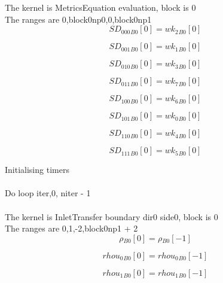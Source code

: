 \documentclass{article}
\begin{document}
\noindent The kernel is MetricsEquation evaluation, block is 0\\\noindent The ranges are 0,block0np0,0,block0np1\\\begin{dmath}{SD_{000}{_{B0}}}[{0}] = {wk_{2}{_{B0}}}[{0}]\end{dmath}

\begin{dmath}{SD_{001}{_{B0}}}[{0}] = {wk_{1}{_{B0}}}[{0}]\end{dmath}

\begin{dmath}{SD_{010}{_{B0}}}[{0}] = {wk_{3}{_{B0}}}[{0}]\end{dmath}

\begin{dmath}{SD_{011}{_{B0}}}[{0}] = {wk_{7}{_{B0}}}[{0}]\end{dmath}

\begin{dmath}{SD_{100}{_{B0}}}[{0}] = {wk_{6}{_{B0}}}[{0}]\end{dmath}

\begin{dmath}{SD_{101}{_{B0}}}[{0}] = {wk_{0}{_{B0}}}[{0}]\end{dmath}

\begin{dmath}{SD_{110}{_{B0}}}[{0}] = {wk_{4}{_{B0}}}[{0}]\end{dmath}

\begin{dmath}{SD_{111}{_{B0}}}[{0}] = {wk_{5}{_{B0}}}[{0}]\end{dmath}

\noindent Initialising timers\\
\\\noindent Do loop iter,0, niter - 1\\
\\\noindent The kernel is InletTransfer boundary dir0 side0, block is 0\\\noindent The ranges are 0,1,-2,block0np1 + 2\\\begin{dmath}{\rho{_{B0}}}[{0}] = {\rho{_{B0}}}[{-1}]\end{dmath}

\begin{dmath}{rhou_{0}{_{B0}}}[{0}] = {rhou_{0}{_{B0}}}[{-1}]\end{dmath}

\begin{dmath}{rhou_{1}{_{B0}}}[{0}] = {rhou_{1}{_{B0}}}[{-1}]\end{dmath}
\end{document}
